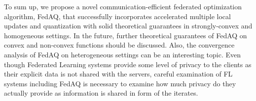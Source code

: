 \documentclass[11pt]{article}
\begin{document}
To sum up, we propose a novel communication-efficient federated optimization algorithm, FedAQ, that successfully incorporates accelerated multiple local updates and quantization with solid theoretical guarantees in strongly-convex and homogeneous settings. In the future, further theoretical guarantees of FedAQ on convex and non-convex functions should be discussed. Also, the convergence analysis of FedAQ on heterogeneous settings can be an interesting topic. Even though Federated Learning systems provide some level of privacy to the clients as their explicit data is not shared with the servers, careful examination of FL systems including FedAQ is necessary to examine how much privacy do they actually provide as information is shared in form of the iterates.
%
\end{document}
